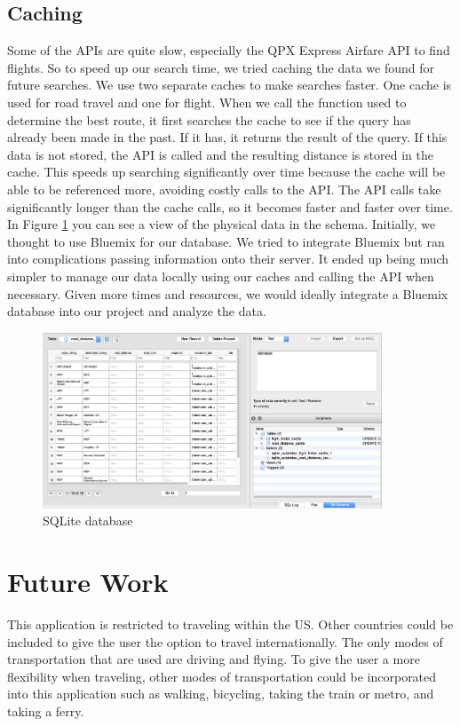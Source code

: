 \documentclass[11pt]{article}
\begin{document}
\pagebreak

\subsection{Caching}

Some of the APIs are quite slow, especially the QPX Express Airfare API to find flights. So to speed up our search time, we tried caching the data we found for future searches.
We use two separate caches to make searches faster. One cache is used for road travel and one for flight. When we call the function used to determine the best route, it first searches the cache to see if the query has already been made in the past. If it has, it returns the result of the query. If this data is not stored, the API is called and the resulting distance is stored in the cache. This speeds up searching significantly over time because the cache will be able to be referenced more, avoiding costly calls to the API. The API calls take significantly longer than the cache calls, so it becomes faster and faster over time. In Figure \ref{fig:db} you can see a view of the physical data in the schema. Initially, we thought to use Bluemix for our database. We tried to integrate Bluemix but ran into complications passing information onto their server. It ended up being much simpler to manage our data locally using our caches and calling the API when necessary. Given more times and resources, we would ideally integrate a Bluemix database into our project and analyze the data.

\begin{figure}[!ht]
  \centering
  \includegraphics[width=0.9\textwidth]{db}
  \caption{SQLite database}
  \label{fig:db}
\end{figure}

\section{Future Work}
This application is restricted to traveling within the US. Other countries could be included to give the user the option to travel internationally. The only modes of transportation that are used are driving and flying. To give the user a more flexibility when traveling, other modes of transportation could be incorporated into this application such as walking, bicycling, taking the train or metro, and taking a ferry.
\end{document}
